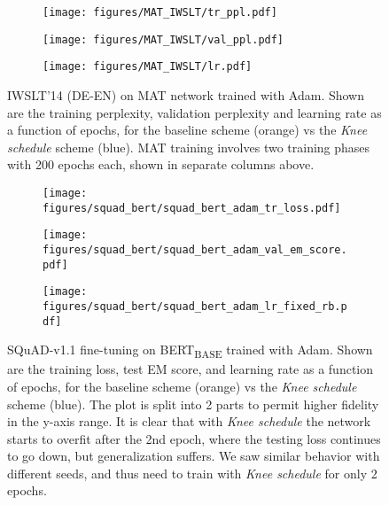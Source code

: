 \documentclass[twoside,11pt]{article}
\newcommand{\lrschedule}{\textit{Knee schedule}}
\begin{document}
\begin{figure}[h]
    \begin{subfigure}[t]{\textwidth}
        \centering
        \texttt{[image: figures/MAT\_IWSLT/tr\_ppl.pdf]}
\label{fig:MAT_adam_tr_ppl}
    \end{subfigure}
    \begin{subfigure}[t]{\textwidth}
        \centering
        \texttt{[image: figures/MAT\_IWSLT/val\_ppl.pdf]}
\label{fig:MAT_adam_val_ppl}
    \end{subfigure}
    \begin{subfigure}[t]{\textwidth}
        \centering
        \texttt{[image: figures/MAT\_IWSLT/lr.pdf]}
\label{fig:MAT_adam_lr}
    \end{subfigure}
\caption{IWSLT'14 (DE-EN) on MAT network trained with Adam. Shown are the training perplexity, validation perplexity and learning rate as a function of epochs, for the baseline scheme (orange) vs the \lrschedule{} scheme (blue). MAT training involves two training phases with 200 epochs each, shown in separate columns above.}
\label{fig:MAT_adam_result}
\end{figure}
\fi


\begin{figure}[h]
    \begin{subfigure}[t]{\textwidth}
        \centering
        \texttt{[image: figures/squad\_bert/squad\_bert\_adam\_tr\_loss.pdf]}
\label{fig:squad_bert_adam_tr_loss}
    \end{subfigure}
    \begin{subfigure}[t]{\textwidth}
        \centering
        \texttt{[image: figures/squad\_bert/squad\_bert\_adam\_val\_em\_score.pdf]}
\label{fig:squad_bert_adam_test_acc}
    \end{subfigure}
    \begin{subfigure}[t]{\textwidth}
        \centering
        \texttt{[image: figures/squad\_bert/squad\_bert\_adam\_lr\_fixed\_rb.pdf]}
\label{fig:squad_bert_adam_lr}
    \end{subfigure}
\caption{SQuAD-v1.1 fine-tuning on BERT\textsubscript{BASE} trained with Adam. Shown are the training loss, test EM score, and learning rate as a function of epochs, for the baseline scheme (orange) vs the \lrschedule{} scheme (blue). The plot is split into 2 parts to permit higher fidelity in the y-axis range. It is clear that with \lrschedule{} the network starts to overfit after the 2nd epoch, where the testing loss continues to go down, but generalization suffers. We saw similar behavior with different seeds, and thus need to train with \lrschedule{} for only 2 epochs.}

\label{fig:squad_bert_adam_result}
\end{figure}
 
\end{document}
